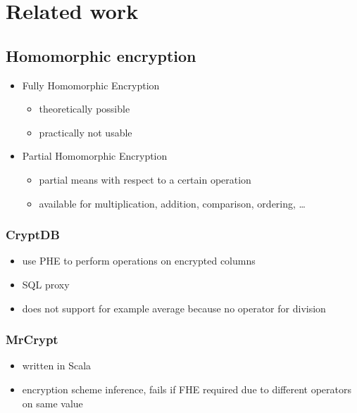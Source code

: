 \chapter{Related work}
\label{cha:related-work}

\section{Homomorphic encryption}
\label{sec:homom-encrypt}
\begin{itemize}
\item Fully Homomorphic Encryption
  \begin{itemize}
  \item theoretically possible
  \item practically not usable
  \end{itemize}
\item Partial Homomorphic Encryption
  \begin{itemize}
  \item partial means with respect to a certain operation
  \item available for multiplication, addition, comparison, ordering, \dots
  \end{itemize}
\end{itemize}

\subsection{CryptDB}
\label{sec:cryptdb}

\cite{CryptDB}
\begin{itemize}
\item use PHE to perform operations on encrypted columns
\item SQL proxy
\item does not support for example average because no operator for division
\end{itemize}

\subsection{MrCrypt}
\label{sec:mrcrypt}

\cite{MrCrypt}
\begin{itemize}
\item written in Scala
\item encryption scheme inference, fails if FHE required due to
  different operators on same value
\end{itemize}

